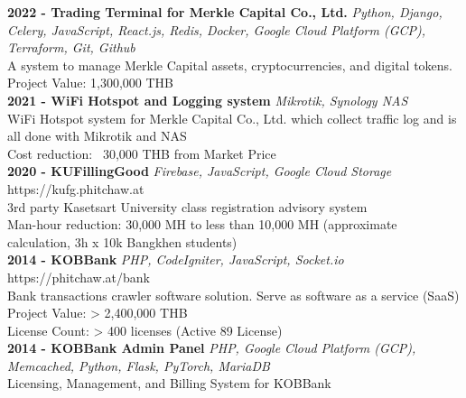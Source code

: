 {\textbf{2022 - Trading Terminal for Merkle Capital Co., Ltd.}} {\sl Python, Django, Celery, JavaScript, React.js, Redis, Docker, Google Cloud Platform (GCP), Terraform, Git, Github} \\
A system to manage Merkle Capital assets, cryptocurrencies, and digital tokens.\\
Project Value: 1,300,000 THB\\
\vspace*{2mm}
{\textbf{2021 - WiFi Hotspot and Logging system}} {\sl Mikrotik, Synology NAS} \\
WiFi Hotspot system for Merkle Capital Co., Ltd. which collect traffic log and is all done with Mikrotik and NAS\\
Cost reduction: ~30,000 THB from Market Price\\
\vspace*{2mm}
{\textbf{2020 - KUFillingGood}} {\sl Firebase, JavaScript, Google Cloud Storage} \hfill https://kufg.phitchaw.at\\
3rd party Kasetsart University class registration advisory system\\
Man-hour reduction: 30,000 MH to less than 10,000 MH (approximate calculation, 3h x 10k Bangkhen students)\\
\vspace*{2mm}
{\textbf{2014 - KOBBank}} {\sl PHP, CodeIgniter, JavaScript, Socket.io} \hfill https://phitchaw.at/bank\\
Bank transactions crawler software solution. Serve as software as a service (SaaS)\\
Project Value: > 2,400,000 THB\\
License Count: > 400 licenses (Active 89 License)\\
\vspace*{2mm}
{\textbf{2014 - KOBBank Admin Panel}} {\sl PHP, Google Cloud Platform (GCP), Memcached, Python, Flask, PyTorch, MariaDB} \\
Licensing, Management, and Billing System for KOBBank\\
\vspace{2mm}

